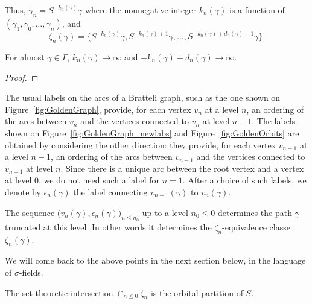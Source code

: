 \documentclass[12pt,a4paper]{article}
\begin{document}
Thus, $\bar\gamma_n = S^{-k_n(\gamma)}\gamma$ where the nonnegative integer $k_n(\gamma)$ 
is a function of $(\gamma_{1}, \gamma_0, \ldots, \gamma_n)$, and 
$$
\zeta_n(\gamma) = \{S^{-k_n(\gamma)}\gamma, S^{-k_n(\gamma)+1}\gamma, 
\ldots, S^{-k_n(\gamma)+d_n(\gamma)-1}\gamma \}.
$$ 

\begin{lemma}\label{lemma:infinitelimits}
For almost $\gamma \in \Gamma$, 
$k_n(\gamma) \to \infty$ and $-k_n(\gamma)+d_n(\gamma) \to \infty$.
\end{lemma}

\begin{proof}

\end{proof}

The usual labels on the arcs of a Bratteli graph, such as the one 
shown on Figure~\ref{fig:GoldenGraph}, provide, for each vertex $v_n$ 
at a level $n$, an ordering of the arcs between $v_n$ and the vertices connected 
to $v_n$ at level $n-1$.  
The labels shown on Figure~\ref{fig:GoldenGraph_newlabs} and Figure~\ref{fig:GoldenOrbits} 
are obtained by considering the other direction: they provide, 
for each vertex $v_{n-1}$ at a level $n-1$, 
an ordering of the arcs between $v_{n-1}$ and the vertices connected 
to $v_{n-1}$ at level $n$. 
Since there is a unique arc between the root vertex and a vertex at level $0$, 
we do not need such a label for $n=1$. 
After a choice of such labels, we denote 
by $\epsilon_n(\gamma)$ the label connecting $v_{n-1}(\gamma)$ to 
$v_n(\gamma)$. 
 
The sequence $\bigl(v_n(\gamma), \epsilon_n(\gamma)\bigr)_{n \leq n_0}$ up to 
a level $n_0 \leq 0$ determines the path $\gamma$ truncated at this level. 
In other words it determines the $\zeta_{n}$-equivalence classe 
$\zeta_n(\gamma)$. 

We will come back to the above points in the next section below, in the 
language of $\sigma$-fields. 

\begin{lemma}
The set-theoretic intersection $\cap_{n \leq 0} \zeta_n$ is the orbital partition of $S$. 
\end{lemma}

%
\end{document}
